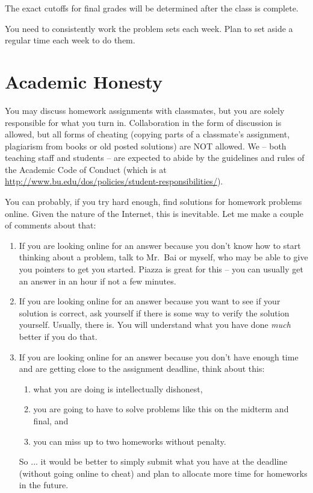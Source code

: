 \documentclass[11pt]{article}
\begin{document}
The exact cutoffs for final grades will be determined after the class is
complete.

You need to consistently work the problem sets each week.   Plan
  to set aside a regular time each week to do them.

\newpage

\section*{Academic Honesty}

You may discuss homework assignments with classmates, but you are 
solely responsible for what you turn in. Collaboration in the form of
discussion is allowed, but all forms of cheating (copying parts of a
classmate's assignment, plagiarism from books or old posted solutions)
are NOT allowed. We -- both teaching staff and students -- are expected
to abide by the guidelines and rules of the Academic Code of Conduct
(which is at
\url{http://www.bu.edu/dos/policies/student-responsibilities/}).

You can probably, if you try hard enough, find solutions for homework
problems online.    Given the nature of the Internet, this is
inevitable.   Let me make a couple of comments about that:
\begin{enumerate}
\item If you are looking online for an answer because you don't know how
  to start thinking about a problem, talk to Mr.\ Bai or myself, who may be
  able to give you pointers to get you started.  Piazza is great for
  this -- you can usually get an answer in an hour if not a few minutes.
\item If you are looking online for an answer because you want to see if
  your solution is correct, ask yourself if there is some way to verify
  the solution yourself.   Usually, there is.  You will understand what you have done
  \emph{much} better if you do that.
\item If you are looking online for an answer because you don't have
  enough time and are getting close to the assignment deadline, think about this:
  \begin{enumerate}
  \item what you are doing is intellectually dishonest,
  \item you are going to have to solve problems like this on the midterm
    and final, and
  \item you can miss up to two homeworks without penalty.
  \end{enumerate}
So ... it would be better to simply submit what you have at the deadline
(without going online to cheat) and plan to allocate more time for
homeworks in the future.
\end{enumerate}
\end{document}
